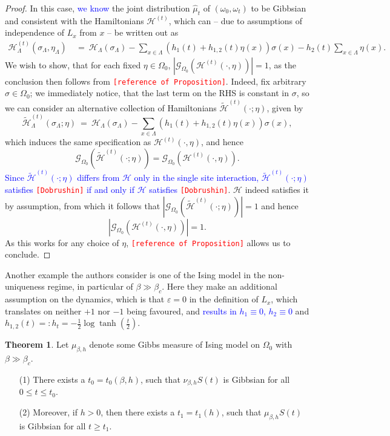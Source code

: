 \documentclass[12pt]{article}
\newcommand{\G}{\mathcal{G}}
\renewcommand{\H}{\mathcal{H}}
\newcommand{\oklepaj}[1]{\left(#1\right)}
\newcommand{\pika}{\boldsymbol{\cdot}}
\newcommand{\1}{\mathbbm{1}}
\newcommand{\5}{\vspace{0.5cm}}
\renewcommand{\tilde}{\widetilde}
\renewcommand{\hat}{\widehat}
\theoremstyle{definition}
\newtheorem{thm}{Theorem}[section]
\begin{document}
\begin{proof}
In this case, \textcolor{blue}{we know} the joint distribution $\hat{\mu}_t$ of $(\omega_0,\omega_t)$ to be Gibbsian and consistent with the Hamiltonians $\H^{(t)}$, which can -- due to assumptions of independence of $L_x$ from $x$ -- be written out as
\begin{align*}
\H_\Lambda^{(t)}(\sigma_\Lambda,\eta_\Lambda) ~&=~ \H_\Lambda(\sigma_\Lambda) - \sum_{x\in\Lambda}\oklepaj{h_1(t)+h_{1,2}(t)\eta(x)}\sigma(x) - h_2(t)\sum_{x\in\Lambda}\eta(x).
\end{align*}
We wish to show, that for each fixed $\eta\in\Omega_0$, $|\G_{\Omega_0}(\H^{(t)}(\pika,\eta))|=1$, as the conclusion then follows from \textcolor{red}{\texttt{[reference of Proposition]}}. Indeed, fix arbitrary $\sigma\in\Omega_0$; we immediately notice, that the last term on the RHS is constant in $\sigma$, so we can consider an alternative collection of Hamiltonians $\tilde{\H}^{(t)}(\pika;\eta)$, given by
$$\tilde{\H}_\Lambda^{(t)}(\sigma_\Lambda;\eta) ~=~ \H_\Lambda(\sigma_\Lambda) - \sum_{x\in\Lambda}\oklepaj{h_1(t)+h_{1,2}(t)\eta(x)}\sigma(x),$$
which induces the same specification as $\H^{(t)}(\pika,\eta)$, and hence 
$$\G_{\Omega_0}(\tilde{\H}^{(t)}(\pika;\eta))=\G_{\Omega_0}(\H^{(t)}(\pika,\eta)).$$
\textcolor{blue}{Since $\tilde{\H}^{(t)}(\pika;\eta)$ differs from $\H$ only in the single site interaction, $\tilde{\H}^{(t)}(\pika;\eta)$ satisfies \textcolor{red}{\texttt{[Dobrushin]}} if and only if $\H$ satisfies \textcolor{red}{\texttt{[Dobrushin]}}}. $\H$ indeed satisfies it by assumption, from which it follows that $|\G_{\Omega_0}(\tilde{\H}^{(t)}(\pika;\eta))|=1$ and hence 
$$|\G_{\Omega_0}(\H^{(t)}(\pika,\eta))|=1.$$
As this works for any choice of $\eta$, \textcolor{red}{\texttt{[reference of Proposition]}} allows us to conclude.
\end{proof}

Another example the authors consider is one of the Ising model in the non-uniqueness regime, in particular of $\beta\gg\beta_c$. Here they make an additional assumption on the dynamics, which is that $\varepsilon=0$ in the definition of $L_x$, which translates on neither $+1$ nor $-1$ being favoured, and \textcolor{blue}{results in $h_1\equiv 0$, $h_2\equiv 0$} and $h_{1,2}(t)=:h_t=-\frac{1}{2}\log\tanh(\frac{t}{2})$.

\begin{thm}
Let $\mu_{\beta,h}$ denote some Gibbs measure of Ising model on $\Omega_0$ with $\beta\gg\beta_c$.
\begin{itemize}
	\item[(1)] There exists a $t_0=t_0(\beta,h)$, such that $\nu_{\beta,h}S(t)$ is Gibbsian for all $0\leq t\leq t_0$.
	\item[(2)] Moreover, if $h>0$, then there exists a $t_1=t_1(h)$, such that $\mu_{\beta,h}S(t)$ is Gibbsian for all $t\geq t_1$.
\end{itemize} 
\end{thm}
\end{document}

